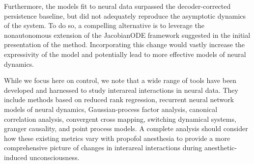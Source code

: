 Furthermore, the models fit to neural data surpassed the decoder-corrected persistence baseline, but did not adequately reproduce the asymptotic dynamics of the system. To do so, a compelling alternative is to leverage the nonautonomous extension of the JacobianODE framework suggested in the initial presentation of the method.\cite{Eisen2025-wt} Incorporating this change would vastly increase the expressivity of the model and potentially lead to more effective models of neural dynamics.

While we focus here on control, we note that a wide range of tools have been developed and harnessed to study interareal interactions in neural data.\cite{Kass2023-dt, Semedo2020-qz} They include methods based on reduced rank regression,\cite{Semedo2019-ml, MacDowell2023-da} recurrent neural network models of neural dynamics,\cite{Perich2021-sq, Perich2020-ii, Andalman2019-ks, Pinto2019-ak, Kleinman2021-dz} Gaussian-process factor analysis,\cite{Gokcen2022-gu} canonical correlation analysis,\cite{Ebrahimi2022-ed, Rodu2018-bb} convergent cross mapping,\cite{Ye2015-ma, Sugihara2012-be} switching dynamical systems,\cite{Karniol-Tambour2023-ti, Glaser2020-kz} granger causality,\cite{Bressler2011-dp, Seth2015-be} and point process models.\cite{Chen2022-pm} A complete analysis should consider how these existing metrics vary with propofol anesthesia to provide a more comprehensive picture of changes in interareal interactions during anesthetic-induced unconsciousness.